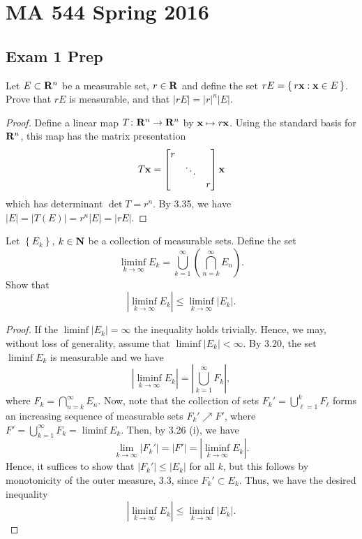 \chapter{MA 544 Spring 2016}
\section{Exam 1 Prep}
\begin{problem}
Let $E\subset\mathbf{R}^n$ be a measurable set, $r\in\mathbf{R}$ and define the set
$rE=\left\{\,r\mathbf{x}:\mathbf{x}\in E\,\right\}$. Prove that $rE$ is
measurable, and that $|rE|=|r|^n|E|$.
\end{problem}
\begin{proof}
Define a linear map $T\colon\mathbf{R}^n\to\mathbf{R}^n$ by $\mathbf{x}\mapsto r\mathbf{x}$. Using
the standard basis for $\mathbf{R}^n$, this map has the matrix presentation
\begin{equation}
\label{eq:matrix-presentation}
T\mathbf{x}=
\begin{bmatrix}
r&\\
&\ddots\\
&&r
\end{bmatrix}\mathbf{x}
\end{equation}
which has determinant $\det T=r^n$. By 3.35, we have
$|E|=|T(E)|=r^n|E|=|rE|$.
\end{proof}

\begin{problem}
Let $\left\{ E_k \right\}$, $k\in\mathbf{N}$ be a collection of measurable
sets. Define the set
\[
\liminf_{k\to\infty} E_k
=\bigcup_{k=1}^\infty\left(\bigcap_{n=k}^\infty E_n\right).
\]
Show that
\[
\left|\liminf_{k\to\infty} E_k\right|\leq\liminf_{k\to\infty}\left|E_k\right|.
\]
\end{problem}
\begin{proof}
If the $\liminf\left|E_k\right|=\infty$ the inequality holds
trivially. Hence, we may, without loss of generality, assume that
$\liminf\left|E_k\right|<\infty$. By 3.20, the set $\liminf E_k$ is
measurable and we have
\begin{equation}
  \label{eq:limsup-rewrite}
\left|\liminf_{k\to\infty} E_k\right|
=\left|\bigcup_{k=1}^\infty F_k\right|,
\end{equation}
where $F_k=\bigcap_{n=k}^\infty E_n$. Now, note that the collection
of sets $F_k'=\bigcup_{\ell=1}^k F_\ell$ forms an increasing
sequence of measurable sets $F_k'\nearrow F'$, where
$F'=\bigcup_{k=1}^\infty F_k=\liminf E_k$. Then, by 3.26 (i), we have
\begin{equation}
  \label{eq:monotone-increasing-limit}
\lim_{k\to\infty}\left|F_k'\right|
=\left|F'\right|
=\left|\liminf_{k\to\infty} E_k\right|.
\end{equation}
Hence, it suffices to show that $\left|F_k'\right|\leq\left|E_k\right|$ for
all $k$, but this follows by monotonicity of the outer measure, 3.3, since
$F_k'\subset E_k$. Thus, we have the desired inequality
\begin{equation}
  \label{eq:meas-liminf-liminf-meas}
\left|\liminf_{k\to\infty} E_k\right|
\leq\liminf_{k\to\infty}\left|E_k\right|.
\end{equation}
\end{proof}


